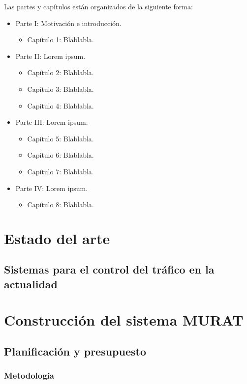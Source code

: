 Las partes y capítulos están organizados de la siguiente forma:
\begin{itemize}
    \item Parte I: Motivación e introducción. 
    \begin{itemize}
        \item Capítulo 1: Blablabla.
    \end{itemize}

    \item Parte II: Lorem ipsum.
    \begin{itemize}
        \item Capítulo 2: Blablabla.
        \item Capítulo 3: Blablabla.
        \item Capítulo 4: Blablabla.
    \end{itemize}

    \item Parte III: Lorem ipsum.
    \begin{itemize}
        \item Capítulo 5: Blablabla.
        \item Capítulo 6: Blablabla.
        \item Capítulo 7: Blablabla.
    \end{itemize}

    \item Parte IV: Lorem ipsum.
    \begin{itemize}
        \item Capítulo 8: Blablabla.
    \end{itemize}
\end{itemize}

\part{Estado del arte}
\chapter{Sistemas para el control del tráfico en la actualidad}

\part{Construcción del sistema MURAT}
\chapter{Planificación y presupuesto}
\section{Metodología}
